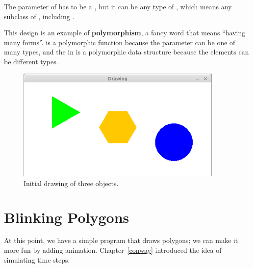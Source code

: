 The parameter of  has to be a , but it can be any type of , which means any subclass of , including .


This design is an example of {\bf polymorphism}, a fancy word that means ``having many forms''.
 is a polymorphic function because the parameter can be one of many types, and the  in  is a polymorphic data structure because the elements can be different types.


\begin{figure}[!ht]
\begin{center}
\includegraphics[width=4in]{figs/drawing.png}
\caption{Initial drawing of three  objects.}
\label{fig:drawing}
\end{center}
\end{figure}



\section{Blinking Polygons}
\label{sec:blinking}

At this point, we have a simple program that draws polygons; we can make it more fun by adding animation.
Chapter~\ref{conway} introduced the idea of simulating time steps.

